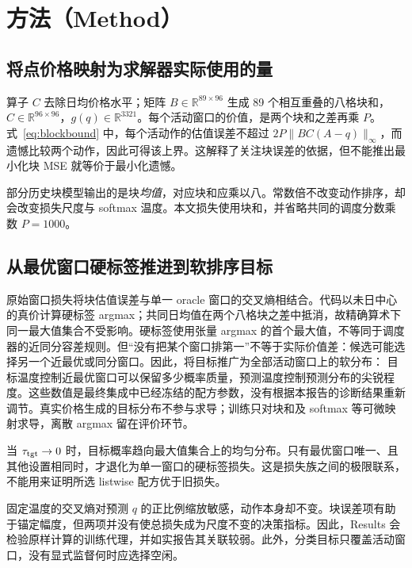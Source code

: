 \documentclass[11pt,a4paper]{article}
\begin{document}
\section{方法（Method）}

\subsection{将点价格映射为求解器实际使用的量}
\EqBlocks
算子 $C$ 去除日均价格水平；矩阵 $B\in\mathbb R^{89\times96}$ 生成 89 个相互重叠的八格块和，$C\in\mathbb R^{96\times96}$，$g(q)\in\mathbb R^{3321}$。每个活动窗口的价值，是两个块和之差再乘 $P$。式~\eqref{eq:blockbound} 中，每个活动作的估值误差不超过 $2P\|BC(A-q)\|_\infty$，而遗憾比较两个动作，因此可得该上界。这解释了关注块误差的依据，但不能推出最小化块 MSE 就等价于最小化遗憾。

部分历史块模型输出的是块\emph{均值}，对应块和应乘以八。常数倍不改变动作排序，却会改变损失尺度与 softmax 温度。本文损失使用块和，并省略共同的调度分数乘数 $P=1000$。

\subsection{从最优窗口硬标签推进到软排序目标}
\EqHardLoss
原始窗口损失将块估值误差与单一 oracle 窗口的交叉熵相结合。代码以未日中心的真价计算硬标签 argmax；共同日均值在两个八格块之差中抵消，故精确算术下同一最大值集合不受影响。硬标签使用张量 argmax 的首个最大值，不等同于调度器的近同分容差规则。但“没有把某个窗口排第一”不等于实际价值差：候选可能选择另一个近最优或同分窗口。因此，将目标推广为全部活动窗口上的软分布：
\EqListwise
目标温度控制近最优窗口可以保留多少概率质量，预测温度控制预测分布的尖锐程度。这些数值是最终集成中已经冻结的配方参数，没有根据本报告的诊断结果重新调节。真实价格生成的目标分布不参与求导；训练只对块和及 softmax 等可微映射求导，离散 argmax 留在评价环节。

当 $\tau_{\rm tgt}\to0$ 时，目标概率趋向最大值集合上的均匀分布。只有最优窗口唯一、且其他设置相同时，才退化为单一窗口的硬标签损失。这是损失族之间的极限联系，不能用来证明所选 listwise 配方优于旧损失。

固定温度的交叉熵对预测 $q$ 的正比例缩放敏感，动作本身却不变。块误差项有助于锚定幅度，但两项并没有使总损失成为尺度不变的决策指标。因此，Results 会检验原样计算的训练代理，并如实报告其关联较弱。此外，分类目标只覆盖活动窗口，没有显式监督何时应选择空闲。
\end{document}
